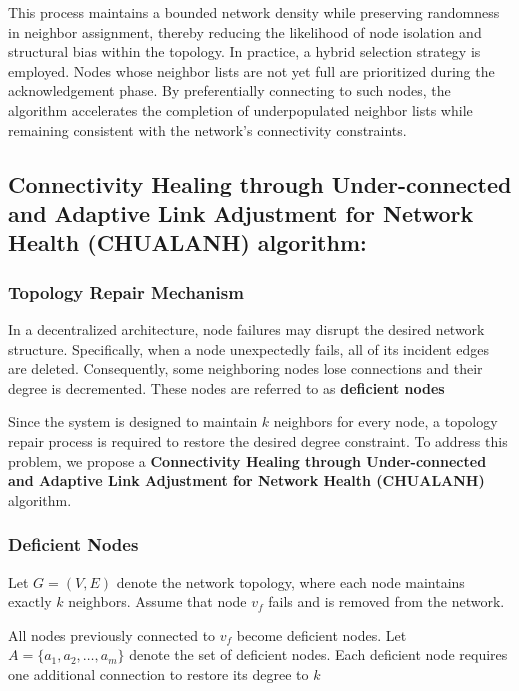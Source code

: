 \begin{enumerate}
\end{enumerate}

This process maintains a bounded network density while preserving randomness in neighbor assignment, thereby reducing
the likelihood of node isolation and structural bias within the topology. In practice, a hybrid selection strategy is
employed. Nodes whose neighbor lists are not yet full are prioritized during the acknowledgement phase. By
preferentially connecting to such nodes, the algorithm accelerates the completion of underpopulated neighbor lists
while remaining consistent with the network's connectivity constraints.

\subsection{Connectivity Healing through Under-connected and Adaptive Link Adjustment for Network Health
  (CHUALANH) algorithm:}
\label{subsec:node_deletion}

\subsubsection{\textbf{Topology Repair Mechanism}}
\label{subsubsec:repair_mechanism}
In a decentralized architecture, node failures may disrupt the desired network structure. Specifically, when
a node unexpectedly fails, all of its incident edges are deleted. Consequently, some neighboring nodes lose
connections and their degree is decremented. These nodes are referred to as \textbf{deficient nodes}

Since the system is designed to maintain $k$ neighbors for every node, a topology repair process is required to restore
the desired degree constraint. To address this problem, we propose a \textbf{Connectivity Healing through
  Under-connected and Adaptive Link Adjustment for Network Health (CHUALANH)} algorithm.

\subsubsection{\textbf{Deficient Nodes}}
\label{subsubsec:deficient_node}
Let $G = (V, E)$ denote the network topology, where each node maintains exactly $k$ neighbors. Assume that
node $v_f$ fails and is removed from the network.

All nodes previously connected to $v_f$ become deficient nodes. Let $A = \{a_1, a_2, \ldots, a_m\}$ denote the set of
deficient nodes. Each deficient node requires one additional connection to restore its degree to $k$

